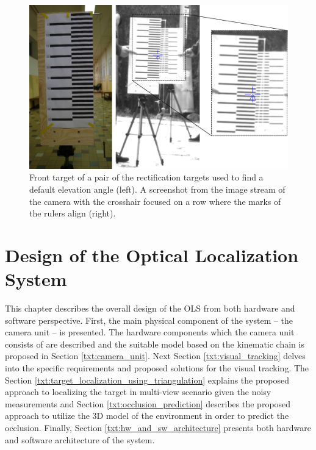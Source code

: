 \begin{figure}[htb]
	\centering
	\includegraphics[width=13cm]{fig/rect_default_elevation_angle.pdf}
	\caption{Front target of a pair of the rectification targets used to find a default elevation angle (left). A screenshot from the image stream of the camera with the crosshair focused on a row where the marks of the rulers align (right).}
	\label{fig:rect_default_elevation_angle}
\end{figure}


\chapter{Design of the Optical Localization System} \label{txt:design_of_the_OLS}

This chapter describes the overall design of the OLS from both hardware and software perspective. First, the main physical component of the system -- the camera unit -- is presented. The hardware components which the camera unit consists of are described and the suitable model based on the kinematic chain is proposed in Section \ref{txt:camera_unit}. Next Section \ref{txt:visual_tracking} delves into the specific requirements and proposed solutions for the visual tracking. The Section \ref{txt:target_localization_using_triangulation} explains the proposed approach to localizing the target in multi-view scenario given the noisy measurements and Section \ref{txt:occlusion_prediction} describes the proposed approach to utilize the 3D model of the environment in order to predict the occlusion. Finally, Section \ref{txt:hw_and_sw_architecture} presents both hardware and software architecture of the system.

